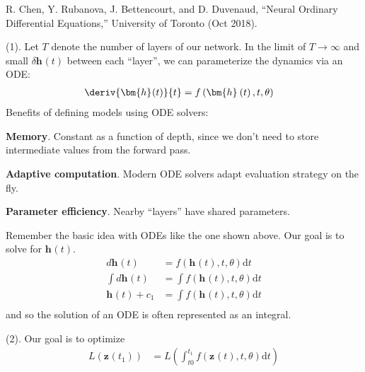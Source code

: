 \documentclass[11pt]{article}
\renewcommand\vec[2][]{\bm{#2}_{#1}}
\newcommand\p{\Needspace{10\baselineskip} \noindent}
\begin{document}
\vspace{-1em}
{\footnotesize R. Chen, Y. Rubanova, J. Bettencourt, and D. Duvenaud, ``Neural Ordinary Differential Equations,'' University of Toronto  (Oct 2018).}

\p {} (1). Let $T$ denote the number of layers of our network. In the limit of $T \rightarrow \infty$ and small $\delta \vec{h}(t)$ between each ``layer'', we can parameterize the dynamics via an ODE:
\begin{align}
	\deriv{\vec{h}(t)}{t}
		&= f\left(
			\vec{h}\left(t \right), t, \theta	 
		\right) \label{eq:neural-ode-1}
\end{align}
Benefits of defining models using ODE solvers:
\begin{compactitem}
	\item \textbf{Memory}. Constant as a function of depth, since we don't need to store intermediate values from the forward pass. 
	
	\item \textbf{Adaptive computation}. Modern ODE solvers adapt evaluation strategy on the fly. 
	
	\item \textbf{Parameter efficiency}. Nearby ``layers'' have shared parameters. 
\end{compactitem}

\begin{example}
	Remember the basic idea with ODEs like the one shown above. Our goal is to solve for $\vec{h}(t)$. 
	\begin{align}
		d\vec{h}(t) 
			&= f\left(\vec{h}\left(t \right), t, \theta	 \right) \mathrm{d}t \\
		\int d\vec{h}(t) 
			&= \int f\left(\vec{h}\left(t \right), t, \theta	 \right) \mathrm{d}t \\
		\vec{h}(t) + c_1
			&= \int f\left(\vec{h}\left(t \right), t, \theta	 \right) \mathrm{d}t \\
	\end{align}
	and so the solution of an ODE is often represented as an integral. 
\end{example}


\p {} (2). Our goal is to optimize 
\begin{align}
	L(\vec{z}(t_1))
		&= L \left(
			\int_{t0}^{t_1} f(\vec{z}(t), t, \theta) \mathrm{d}t 
		\right)
\end{align}
\end{document}
